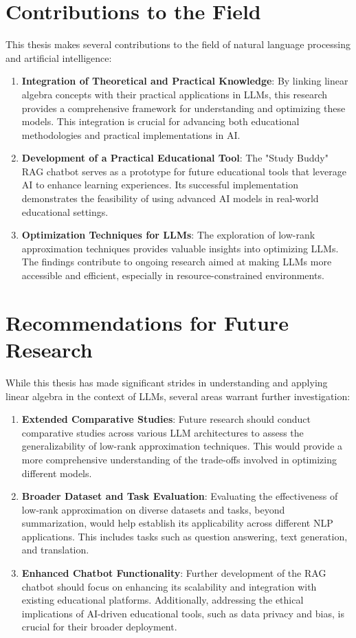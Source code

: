 \section{Contributions to the Field}

This thesis makes several contributions to the field of natural language processing and artificial intelligence:

\begin{enumerate}
    \item \textbf{Integration of Theoretical and Practical Knowledge}: By linking linear algebra concepts with their practical applications in LLMs, this research provides a comprehensive framework for understanding and optimizing these models. This integration is crucial for advancing both educational methodologies and practical implementations in AI.
    \item \textbf{Development of a Practical Educational Tool}: The "Study Buddy" RAG chatbot serves as a prototype for future educational tools that leverage AI to enhance learning experiences. Its successful implementation demonstrates the feasibility of using advanced AI models in real-world educational settings.
    \item \textbf{Optimization Techniques for LLMs}: The exploration of low-rank approximation techniques provides valuable insights into optimizing LLMs. The findings contribute to ongoing research aimed at making LLMs more accessible and efficient, especially in resource-constrained environments.
\end{enumerate}

\section{Recommendations for Future Research}

While this thesis has made significant strides in understanding and applying linear algebra in the context of LLMs, several areas warrant further investigation:

\begin{enumerate}
    \item \textbf{Extended Comparative Studies}: Future research should conduct comparative studies across various LLM architectures to assess the generalizability of low-rank approximation techniques. This would provide a more comprehensive understanding of the trade-offs involved in optimizing different models.
    \item \textbf{Broader Dataset and Task Evaluation}: Evaluating the effectiveness of low-rank approximation on diverse datasets and tasks, beyond summarization, would help establish its applicability across different NLP applications. This includes tasks such as question answering, text generation, and translation.
    \item \textbf{Enhanced Chatbot Functionality}: Further development of the RAG chatbot should focus on enhancing its scalability and integration with existing educational platforms. Additionally, addressing the ethical implications of AI-driven educational tools, such as data privacy and bias, is crucial for their broader deployment.
\end{enumerate}

